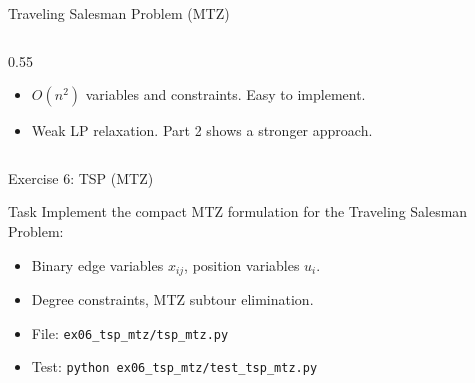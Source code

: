 \documentclass[aspectratio=169,10pt]{beamer}
\begin{document}
\begin{frame}{Traveling Salesman Problem (MTZ)}
\begin{columns}[T]
\begin{column}{0.55\textwidth}
\begin{itemize}\setlength\itemsep{0pt}
  \item $O(n^2)$ variables and constraints. Easy to implement.
  \item Weak LP relaxation. Part 2 shows a stronger approach.
\end{itemize}
\end{column}
\end{columns}
\end{frame}

\begin{frame}{Exercise 6: TSP (MTZ)}
\begin{block}{Task}
Implement the compact MTZ formulation for the Traveling Salesman Problem:
\begin{itemize}
  \item Binary edge variables $x_{ij}$, position variables $u_i$.
  \item Degree constraints, MTZ subtour elimination.
\end{itemize}
\end{block}
\begin{itemize}
  \item File: \texttt{ex06\_tsp\_mtz/tsp\_mtz.py}
  \item Test: \texttt{python ex06\_tsp\_mtz/test\_tsp\_mtz.py}
\end{itemize}
\end{frame}
\end{document}
